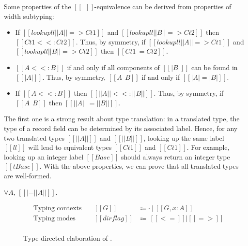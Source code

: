\begin{lemma}\label{thm:trans}
  Some properties of the $[[~~]]$-equivalence can be derived from properties of width subtyping:
  \begin{itemize}
  \item If $[[lookup ll ||A|| => Ct1]]$ and $[[lookup ll ||B|| => Ct2]]$
    then $[[Ct1 <<: Ct2]]$.
    Thus, by symmetry, if $[[lookup ll ||A|| => Ct1]]$ and $[[lookup ll ||B|| => Ct2]]$
    then $[[Ct1 ~= Ct2]]$.
  \item $[[A <<: B]]$ if and only if all components of $[[| B |]]$ can be found in $[[| A |]]$.
    Thus, by symmetry, $[[A ~~ B]]$ if and only if  $[[| A | = | B |]]$.
  \item If $[[A <<: B]]$ then $[[|| A || <<: || B ||]]$. Thus, by symmetry,
    if $[[A ~~ B]]$ then $[[|| A || ~= || B ||]]$.
  \end{itemize}
\end{lemma}

\noindent
The first one is a strong result about type translation: in a translated type,
the type of a record field can be determined by its associated label. Hence, for
any two translated types $[[||A||]]$ and $[[||B||]]$, looking up the same label
$[[ll]]$ will lead to equivalent types $[[Ct1]]$ and $[[Ct1]]$. For example,
looking up an integer label $[[Base]]$ should always return an integer type
$[[tBase]]$. With the above properties, we can prove that all translated types
are well-formed.

\begin{lemma}\label{thm:wf-trans}
  $\forall A$, $[[ |- ||A|| ]]$.
\end{lemma}

\begin{figure}[t]
  \small
  \begin{align*}
    &\text{Typing contexts} &\quad[[G]] &\Coloneqq \cdot ~|~ [[ G, x:A ]] \\
    &\text{Typing modes} &\quad[[dirflag]] &\Coloneqq~ [[<=]] | [[=>]] \\
  \end{align*}

  \ottdefnsElaboration

  \caption{Type-directed elaboration of \lambdaiplus.}
  \label{fig:source-typing}
\end{figure}

